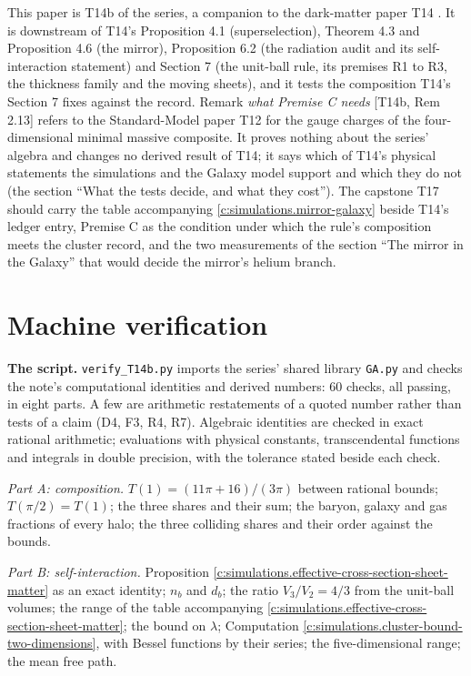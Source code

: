 \documentclass[11pt]{article}
\theoremstyle{definition}
\theoremstyle{plain}
\providecommand{\file}{}\renewcommand{\file}[1]{\texttt{#1}}
\begin{document}
\label{c:note.simulations.setting-position-series}
This paper is T14b of the series, a companion to the dark-matter paper T14 \cite{ButlerT14}. It is downstream of T14's Proposition 4.1 (superselection), Theorem 4.3 and Proposition 4.6 (the mirror), Proposition 6.2 (the radiation audit and its self-interaction statement) and Section 7 (the unit-ball rule, its premises R1 to R3, the thickness family and the moving sheets), and it tests the composition T14's Section 7 fixes against the record. Remark \emph{what Premise C needs} [T14b, Rem 2.13] refers to the Standard-Model paper T12 \cite{ButlerT12} for the gauge charges of the four-dimensional minimal massive composite. It proves nothing about the series' algebra and changes no derived result of T14; it says which of T14's physical statements the simulations and the Galaxy model support and which they do not (the section ``What the tests decide, and what they cost''). The capstone T17 \cite{ButlerT17} should carry the table accompanying \ref{c:simulations.mirror-galaxy} beside T14's ledger entry, Premise C as the condition under which the rule's composition meets the cluster record, and the two measurements of the section ``The mirror in the Galaxy'' that would decide the mirror's helium branch.

\section{Machine verification}

\label{c:note.simulations.setting-machine-verification}
\textbf{The script.} \file{verify\_T14b.py} \cite{ButlerVerifyT14b} imports the series' shared library \file{GA.py} and checks the note's computational identities and derived numbers: $60$ checks, all passing, in eight parts. A few are arithmetic restatements of a quoted number rather than tests of a claim (D4, F3, R4, R7). Algebraic identities are checked in exact rational arithmetic; evaluations with physical constants, transcendental functions and integrals in double precision, with the tolerance stated beside each check.

\emph{Part A: composition.} $T(1) = (11\pi + 16)/(3\pi)$ between rational bounds; $T(\pi/2) = T(1)$; the three shares and their sum; the baryon, galaxy and gas fractions of every halo; the three colliding shares and their order against the bounds.

\emph{Part B: self-interaction.} Proposition \ref{c:simulations.effective-cross-section-sheet-matter} as an exact identity; $n_{b}$ and $d_{b}$; the ratio $V_{3}/V_{2} = 4/3$ from the unit-ball volumes; the range of the table accompanying \ref{c:simulations.effective-cross-section-sheet-matter}; the bound on $\lambda$; Computation \ref{c:simulations.cluster-bound-two-dimensions}, with Bessel functions by their series; the five-dimensional range; the mean free path.
\end{document}
